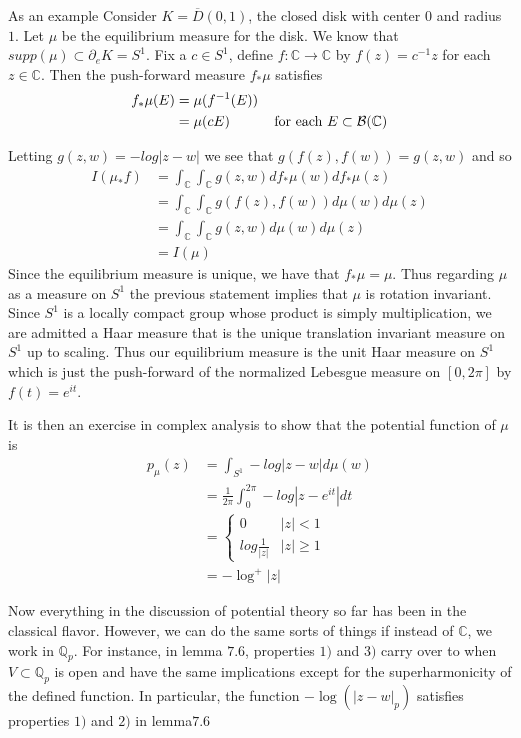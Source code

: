 \documentclass[12pt]{amsart}
\theoremstyle{definition}
\theoremstyle{remark}
\theoremstyle{definition}
\newcommand{\C}{\mathbb{C}}
\newcommand{\Q}{\mathbb{Q}}
\newcommand{\MCB}{\mathcal{B}}
\begin{document}
As an example Consider $K = \overline{D}(0,1)$, the closed disk with center $0$ and radius $1$. Let $\mu$ be the equilibrium measure for the disk. We know that $supp(\mu) \subset \partial_eK = S^1$. Fix a $c \in S^1$, define $f:\C \rightarrow \C$ by $f(z) = c^{-1}z$ for each $z \in \C$. Then the push-forward measure $f_*\mu$ satisfies \begin{align*}
f_*\mu(E) 
&= \mu(f^{-1}(E)) \\
&= \mu(cE) \hspace{10mm}\text{ for each } E \subset \MCB(\C) 
\end{align*}

Letting $g(z,w) = -log|z-w|$ we see that $g(f(z),f(w)) = g(z,w)$ and so 
\begin{align*}
I(\mu_*f) 
&= \int_{\C}\int_{\C}g(z,w)df_*\mu(w)df_*\mu(z)\\
&= \int_{\C}\int_{\C}g(f(z),f(w))d\mu(w)d\mu(z)\\
&= \int_{\C}\int_{\C}g(z,w)d\mu(w)d\mu(z)\\
&= I(\mu)
\end{align*} 
Since the equilibrium measure is unique, we have that $f_*\mu = \mu$. Thus regarding $\mu$ as a measure on $S^1$ the previous statement implies that $\mu$ is rotation invariant. Since $S^1$ is a locally compact group whose product is simply multiplication, we are admitted a Haar measure that is the unique translation invariant measure on $S^1$ up to scaling. Thus our equilibrium measure is the unit Haar measure on $S^1$ which is just the push-forward of the normalized Lebesgue measure on $[0,2\pi]$ by $f(t) = e^{it}$.

It is then an exercise in complex analysis to show that the potential function of $\mu$ is 
\begin{align*}
p_\mu(z) 
&= \int_{S^1}-log|z-w|d\mu(w)\\
&= \frac{1}{2\pi}\int_0^{2\pi}-log|z-e^{it}|dt\\
&= \begin{cases} 0 & |z|<1 \\ log\frac{1}{|z|} & |z| \geq
1
\end{cases}\\
&= -\log^+|z|
\end{align*} 

Now everything in the discussion of potential theory so far has been in the classical flavor. However, we can do the same sorts of things if instead of $\C$, we work in $\Q_p$. For instance, in lemma $7.6$, properties $1)$ and $3)$ carry over to when $V \subset \Q_p$ is open and have the same implications except for the superharmonicity of the defined function. In particular, the function $-\log(|z-w|_p)$ satisfies properties $1)$ and $2)$ in lemma$ 7.6$ 
\end{document}
